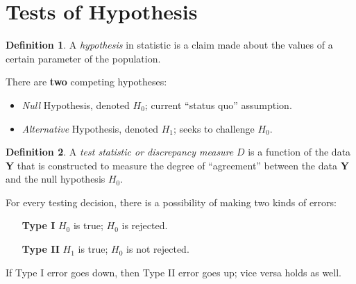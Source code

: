 \documentclass[12pt, leqno]{article}
\theoremstyle{definition}
\newtheorem*{defn}{Definition}
\begin{document}
  \section{Tests of Hypothesis}
  \begin{defn}
    A \emph{hypothesis} in statistic is a claim made about the values of a certain parameter of the population.
  \end{defn}

  There are \textbf{two} competing hypotheses:
  \begin{itemize}
    \item \emph{Null} Hypothesis, denoted $H_{0}$; current ``status quo'' assumption.
    \item \emph{Alternative} Hypothesis, denoted $H_{1}$; seeks to challenge $H_{0}$.
  \end{itemize}

  \begin{defn}
    A \emph{test statistic \emph{or} discrepancy measure} $D$ is a function of the data \textbf{Y} that is constructed to measure the degree of ``agreement'' between the data \textbf{Y} and the null hypothesis $H_{0}$.
  \end{defn}

  For every testing decision, there is a possibility of making two kinds of errors:
  \begin{itemize}
    \item[\textbf{Type I}] $H_{0}$ is true; $H_{0}$ is rejected.
    \item[\textbf{Type II}] $H_{1}$ is true; $H_{0}$ is not rejected.
  \end{itemize}
  If Type I error goes down, then Type II error goes up; vice versa holds as well.
\end{document}
